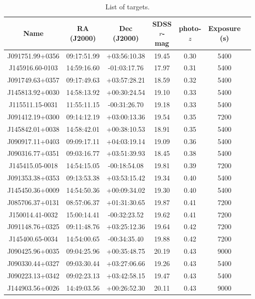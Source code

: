 \documentclass[letterpaper,12pt]{article}
\begin{document}
\begin{table}
\caption{List of targets.}
\begin{tabular}{ccccccc}
\hline

Name & RA (J2000) & Dec (J2000) & SDSS $r$-mag & photo-$z$ & Exposure (s) \\
\hline
J091751.99+0356 & 09:17:51.99 & +03:56:10.38 & 19.45 & 0.30 & 5400 \\
J145916.60-0103 & 14:59:16.60 & -01:03:17.76 & 17.97 & 0.31 & 5400 \\
J091749.63+0357 & 09:17:49.63 & +03:57:28.21 & 18.59 & 0.32 & 5400 \\
J145813.92+0030 & 14:58:13.92 & +00:30:24.54 & 19.10 & 0.33 & 5400 \\
J115511.15-0031 & 11:55:11.15 & -00:31:26.70 & 19.18 & 0.33 & 5400 \\
J091412.19+0300 & 09:14:12.19 & +03:00:13.36 & 19.54 & 0.35 & 7200 \\
J145842.01+0038 & 14:58:42.01 & +00:38:10.53 & 18.91 & 0.35 & 5400 \\
J090917.11+0403 & 09:09:17.11 & +04:03:19.14 & 19.09 & 0.36 & 5400 \\
J090316.77+0351 & 09:03:16.77 & +03:51:39.93 & 18.45 & 0.38 & 5400 \\
J145415.05-0018 & 14:54:15.05 & -00:18:54.08 & 19.81 & 0.39 & 7200 \\
J091353.38+0353 & 09:13:53.38 & +03:53:15.42 & 19.34 & 0.40 & 5400 \\
J145450.36+0009 & 14:54:50.36 & +00:09:34.02 & 19.30 & 0.40 & 5400 \\
J085706.37+0131 & 08:57:06.37 & +01:31:30.65 & 19.87 & 0.41 & 7200 \\
J150014.41-0032 & 15:00:14.41 & -00:32:23.52 & 19.62 & 0.41 & 7200 \\
J091148.76+0325 & 09:11:48.76 & +03:25:12.36 & 19.64 & 0.42 & 7200 \\
J145400.65-0034 & 14:54:00.65 & -00:34:35.40 & 19.88 & 0.42 & 7200 \\
J090425.96+0035 & 09:04:25.96 & +00:35:48.75 & 20.19 & 0.43 & 9000 \\
J090330.44+0327 & 09:03:30.44 & +03:27:06.66 & 19.26 & 0.43 & 5400 \\
J090223.13+0342 & 09:02:23.13 & +03:42:58.15 & 19.47 & 0.43 & 5400 \\
J144903.56+0026 & 14:49:03.56 & +00:26:52.30 & 20.11 & 0.43 & 9000 \\

\end{tabular}
\end{table}
\end{document}

